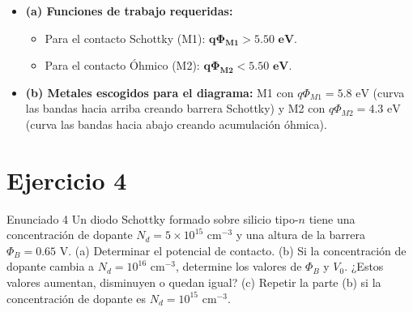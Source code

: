 \documentclass[11pt,a4paper]{article}
\begin{document}
\begin{center}
\end{center}

\begin{respuestabox}
\begin{itemize}
    \item \textbf{(a) Funciones de trabajo requeridas:}
    \begin{itemize}
        \item Para el contacto Schottky (M1): $\mathbf{q\Phi_{M1} > 5.50\text{ eV}}$.
        \item Para el contacto Óhmico (M2): $\mathbf{q\Phi_{M2} < 5.50\text{ eV}}$.
    \end{itemize}
    \item \textbf{(b) Metales escogidos para el diagrama:} M1 con $q\Phi_{M1} = 5.8\text{ eV}$ (curva las bandas hacia arriba creando barrera Schottky) y M2 con $q\Phi_{M2} = 4.3\text{ eV}$ (curva las bandas hacia abajo creando acumulación óhmica).
\end{itemize}
\end{respuestabox}

\newpage

\section*{Ejercicio 4}
\begin{ejerciciobox}{Enunciado 4}
Un diodo Schottky formado sobre silicio tipo-$n$ tiene una concentración de dopante $N_d = 5 \times 10^{15}\text{ cm}^{-3}$ y una altura de la barrera $\Phi_B = 0.65\text{ V}$. (a) Determinar el potencial de contacto. (b) Si la concentración de dopante cambia a $N_d = 10^{16}\text{ cm}^{-3}$, determine los valores de $\Phi_B$ y $V_0$. ¿Estos valores aumentan, disminuyen o quedan igual? (c) Repetir la parte (b) si la concentración de dopante es $N_d = 10^{15}\text{ cm}^{-3}$.
\end{ejerciciobox}
\end{document}
